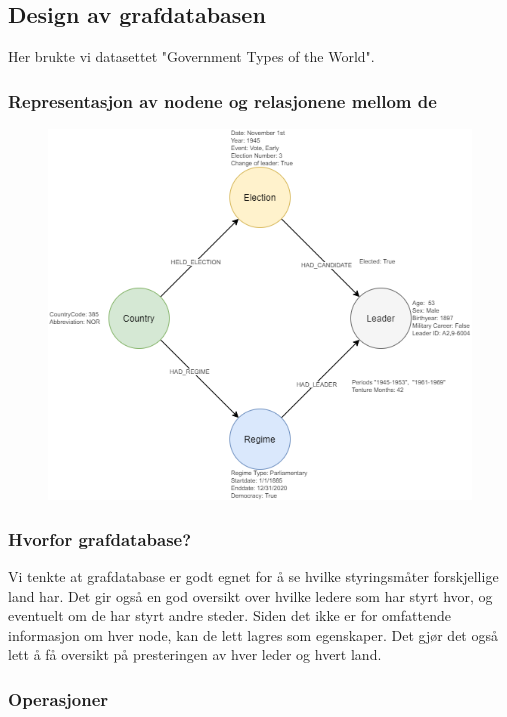 
\subsection{Design av grafdatabasen}
Her brukte vi datasettet "Government Types of the World".

\subsubsection{Representasjon av nodene og relasjonene mellom de}
\FigureCounter
\begin{figure}[H]
  \includegraphics[width=\textwidth]{images/milepael4/graph_database_base.drawio.png}
\end{figure}

\subsubsection{Hvorfor grafdatabase?}
Vi tenkte at grafdatabase er godt egnet for å se hvilke styringsmåter forskjellige land har. Det gir 
også en god oversikt over hvilke ledere som har styrt hvor, og eventuelt om de har styrt andre 
steder. Siden det ikke er for omfattende informasjon om hver node, kan de lett lagres som 
egenskaper. Det gjør det også lett å få oversikt på presteringen av hver leder og hvert land.

\subsubsection{Operasjoner}

